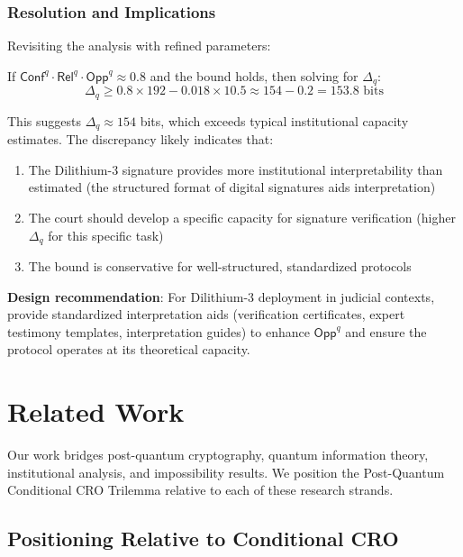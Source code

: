 \documentclass{ieeeaccess}
\newcommand{\Conf}{\mathsf{Conf}}
\newcommand{\Rel}{\mathsf{Rel}}
\newcommand{\Opp}{\mathsf{Opp}}
\begin{document}
\subsubsection{Resolution and Implications}

Revisiting the analysis with refined parameters:

If $\Conf^q \cdot \Rel^q \cdot \Opp^q \approx 0.8$ and the bound holds, then solving for $\Delta_q$:
\begin{equation}
    \Delta_q \geq 0.8 \times 192 - 0.018 \times 10.5 \approx 154 - 0.2 = 153.8 \text{ bits}
\end{equation}

This suggests $\Delta_q \approx 154$ bits, which exceeds typical institutional capacity estimates. The discrepancy likely indicates that:
\begin{enumerate}
    \item The Dilithium-3 signature provides more institutional interpretability than estimated (the structured format of digital signatures aids interpretation)
    \item The court should develop a specific capacity for signature verification (higher $\Delta_q$ for this specific task)
    \item The bound is conservative for well-structured, standardized protocols
\end{enumerate}

\textbf{Design recommendation}: For Dilithium-3 deployment in judicial contexts, provide standardized interpretation aids (verification certificates, expert testimony templates, interpretation guides) to enhance $\Opp^q$ and ensure the protocol operates at its theoretical capacity.


\section{Related Work}\label{sec:related_work}

Our work bridges post-quantum cryptography, quantum information theory, institutional analysis, and impossibility results. We position the Post-Quantum Conditional CRO Trilemma relative to each of these research strands.

\subsection{Positioning Relative to Conditional CRO}
\end{document}
